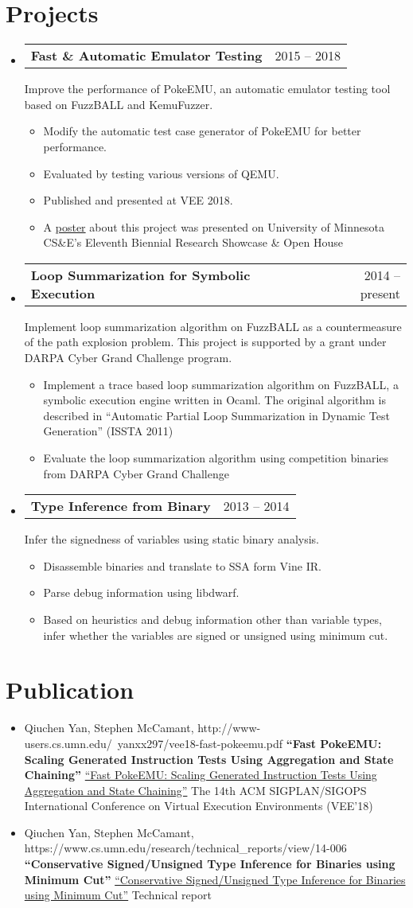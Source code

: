 \documentclass[letterpaper,11pt]{article}
\makeatletter
\newcommand{\normalItem}[1]{
  \item[-]\small{
    { #1 \vspace{-2pt}}
  }
}
\newcommand{\projectSubheading}[3]{
  \vspace{-1pt}\item[]
  \begin{tabular*}{0.97\textwidth}{l@{\extracolsep{\fill}}r}
  \textbf{\small#1} & {\small#2}\\
  \end{tabular*}
      {\small#3}\vspace{-5pt}
}
\newcommand{\bibSubheading}[4]{
  \vspace{-1pt}\item[]
      {\small#2},
      \ifx\hfuzz#4\hfuzz
      \textbf{\small``#1''}      
      \else
      \href{#4}{\small``#1''}
      \fi      
      \small{#3}
    \vspace{-2pt}
}
\newcommand{\resumeSubHeadingListStart}{\begin{itemize}[leftmargin=*]}
\newcommand{\resumeSubHeadingListEnd}{\end{itemize}}
\newcommand{\resumeItemListStart}{\begin{itemize}}
\newcommand{\resumeItemListEnd}{\end{itemize}\vspace{-5pt}}
\makeatother
\begin{document}
\section{Projects}
  \resumeSubHeadingListStart  	
    \projectSubheading{Fast \& Automatic Emulator Testing}{2015 -- 2018}
    {Improve the performance of PokeEMU, an automatic emulator testing tool 
    based on FuzzBALL and KemuFuzzer.}
      \resumeItemListStart
        \normalItem{Modify the automatic test case generator of PokeEMU for better performance.}                
        \normalItem{Evaluated by testing various versions of QEMU.}
        \normalItem{Published and presented at VEE 2018.}
        \normalItem{A \href{http://www-users.cs.umn.edu/~yanxx297/posterFastPokeEMU.pdf}{poster} about this project was presented on University of Minnesota CS\&E's Eleventh Biennial Research Showcase \& Open House}
      \resumeItemListEnd
%        
    \projectSubheading{Loop Summarization for Symbolic Execution}{2014 -- present}
    {Implement loop summarization algorithm on FuzzBALL as a countermeasure of the path explosion problem.
    This project is supported by a grant under DARPA Cyber Grand Challenge 
    program.}
      \resumeItemListStart
      	\normalItem{Implement a trace based loop summarization algorithm on FuzzBALL, 
      	a symbolic execution engine written in Ocaml. The original algorithm is described in 
        ``Automatic Partial Loop Summarization in Dynamic Test Generation''
        (ISSTA 2011) }
        \normalItem{Evaluate the loop summarization algorithm using competition
        binaries from DARPA Cyber Grand Challenge}
      \resumeItemListEnd    
% 
    \projectSubheading{Type Inference from Binary}{2013 -- 2014}
    {Infer the signedness of variables using static binary analysis.}
    	\resumeItemListStart
        	\normalItem{Disassemble binaries and translate to SSA form Vine IR.}
            \normalItem{Parse debug information using libdwarf.}
            \normalItem{Based on heuristics and debug information other than 
            variable types, infer whether the variables are signed or unsigned 
            using minimum cut.}
        \resumeItemListEnd
  \resumeSubHeadingListEnd

%
\section{Publication}
	\resumeSubHeadingListStart
    	\bibSubheading{Fast PokeEMU: Scaling Generated Instruction Tests Using 
        Aggregation and State Chaining}
        {Qiuchen Yan, Stephen McCamant}
        {The 14th ACM SIGPLAN/SIGOPS International Conference on Virtual Execution Environments (VEE'18)}
        {http://www-users.cs.umn.edu/~yanxx297/vee18-fast-pokeemu.pdf}
    	\bibSubheading{Conservative Signed/Unsigned Type Inference for Binaries
        using Minimum Cut}
        {Qiuchen Yan, Stephen McCamant}
        {Technical report}
        {https://www.cs.umn.edu/research/technical_reports/view/14-006}        
    \resumeSubHeadingListEnd         
\end{document}
